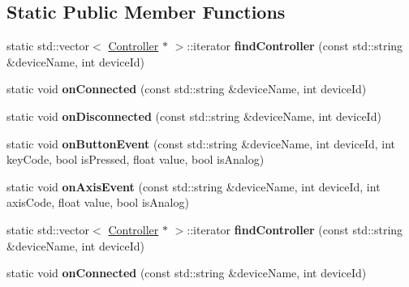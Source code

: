 \subsection*{Static Public Member Functions}
\begin{DoxyCompactItemize}
\item 
\mbox{\label{classControllerImpl_abc030bbce3654c1d3904f52df0105b6e}} 
static std\+::vector$<$ \hyperlink{classController}{Controller} $\ast$ $>$\+::iterator {\bfseries find\+Controller} (const std\+::string \&device\+Name, int device\+Id)
\item 
\mbox{\label{classControllerImpl_a0e5e630ca14e4284f1d4f7360985e18c}} 
static void {\bfseries on\+Connected} (const std\+::string \&device\+Name, int device\+Id)
\item 
\mbox{\label{classControllerImpl_ab96f9df5bfaecd2bd2cde5b4374972d4}} 
static void {\bfseries on\+Disconnected} (const std\+::string \&device\+Name, int device\+Id)
\item 
\mbox{\label{classControllerImpl_ad73868f51506f68926dbe2ea48632697}} 
static void {\bfseries on\+Button\+Event} (const std\+::string \&device\+Name, int device\+Id, int key\+Code, bool is\+Pressed, float value, bool is\+Analog)
\item 
\mbox{\label{classControllerImpl_a7f27d02ca99950a38b88666abaf16077}} 
static void {\bfseries on\+Axis\+Event} (const std\+::string \&device\+Name, int device\+Id, int axis\+Code, float value, bool is\+Analog)
\item 
\mbox{\label{classControllerImpl_abc030bbce3654c1d3904f52df0105b6e}} 
static std\+::vector$<$ \hyperlink{classController}{Controller} $\ast$ $>$\+::iterator {\bfseries find\+Controller} (const std\+::string \&device\+Name, int device\+Id)
\item 
\mbox{\label{classControllerImpl_a0e5e630ca14e4284f1d4f7360985e18c}} 
static void {\bfseries on\+Connected} (const std\+::string \&device\+Name, int device\+Id)
\item 
\mbox{\label{classControllerImpl_ab96f9df5bfaecd2bd2cde5b4374972d4}} 

\end{DoxyCompactItemize}
